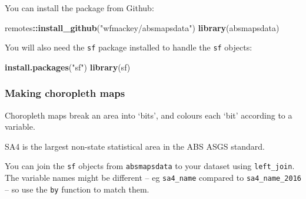 \documentclass[]{book}
\newenvironment{Shaded}{\begin{snugshade}}{\end{snugshade}}
\newcommand{\DataTypeTok}[1]{\textcolor[rgb]{0.13,0.29,0.53}{#1}}
\newcommand{\KeywordTok}[1]{\textcolor[rgb]{0.13,0.29,0.53}{\textbf{#1}}}
\newcommand{\NormalTok}[1]{#1}
\newcommand{\OperatorTok}[1]{\textcolor[rgb]{0.81,0.36,0.00}{\textbf{#1}}}
\newcommand{\StringTok}[1]{\textcolor[rgb]{0.31,0.60,0.02}{#1}}
\begin{document}
You can install the package from Github:

\begin{Shaded}
\begin{Highlighting}[]
\NormalTok{remotes}\OperatorTok{::}\KeywordTok{install_github}\NormalTok{(}\StringTok{"wfmackey/absmapsdata"}\NormalTok{)}
\KeywordTok{library}\NormalTok{(absmapsdata)}
\end{Highlighting}
\end{Shaded}

You will also need the \texttt{sf} package installed to handle the \texttt{sf} objects:

\begin{Shaded}
\begin{Highlighting}[]
\KeywordTok{install.packages}\NormalTok{(}\StringTok{"sf"}\NormalTok{)}
\KeywordTok{library}\NormalTok{(sf)}
\end{Highlighting}
\end{Shaded}

\hypertarget{making-choropleth-maps}{%
\subsubsection{Making choropleth maps}\label{making-choropleth-maps}}

Choropleth maps break an area into `bits', and colours each `bit' according to a variable.

SA4 is the largest non-state statistical area in the ABS ASGS standard.

You can join the \texttt{sf} objects from \texttt{absmapsdata} to your dataset using \texttt{left\_join}. The variable names might be different -- eg \texttt{sa4\_name} compared to \texttt{sa4\_name\_2016} -- so use the \texttt{by} function to match them.

\begin{Shaded}
\end{Shaded}
\end{document}
